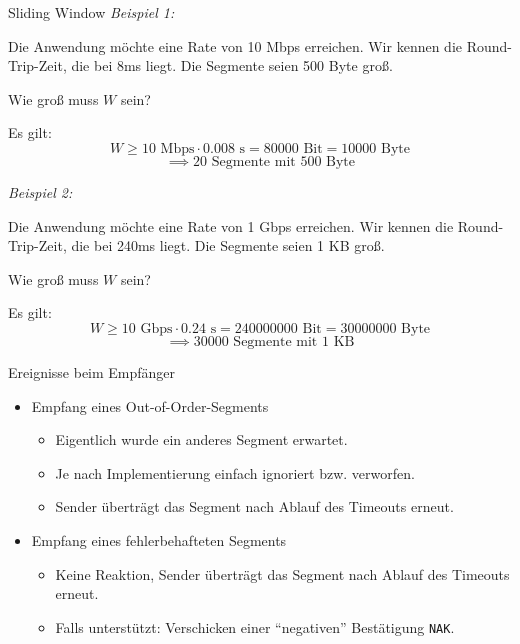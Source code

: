 \begin{example}{Sliding Window}
    \emph{Beispiel 1:}

    Die Anwendung möchte eine Rate von 10 Mbps erreichen.
    Wir kennen die Round-Trip-Zeit, die bei 8ms liegt.
    Die Segmente seien 500 Byte groß.

    Wie groß muss $W$ sein?

    Es gilt:
    \[
        W \geq 10 \text{ Mbps} \cdot 0.008 \text{ s} = \num{80000} \text{ Bit} = \num{10000} \text{ Byte}
    \]
    \[
        \implies 20 \text{ Segmente mit } 500 \text{ Byte}
    \]

    \emph{Beispiel 2:}

    Die Anwendung möchte eine Rate von 1 Gbps erreichen.
    Wir kennen die Round-Trip-Zeit, die bei 240ms liegt.
    Die Segmente seien 1 KB groß.

    Wie groß muss $W$ sein?

    Es gilt:
    \[
        W \geq 10 \text{ Gbps} \cdot 0.24 \text{ s} = \num{240000000} \text{ Bit} = \num{30000000} \text{ Byte}
    \]
    \[
        \implies \num{30000} \text{ Segmente mit } 1 \text{ KB}
    \]

\end{example}

\begin{defi}{Ereignisse beim Empfänger}
    \begin{itemize}
        \item Empfang eines Out-of-Order-Segments
              \begin{itemize}
                  \item Eigentlich wurde ein anderes Segment erwartet.
                  \item Je nach Implementierung einfach ignoriert bzw. verworfen.
                  \item Sender überträgt das Segment nach Ablauf des Timeouts erneut.
              \end{itemize}
        \item Empfang eines fehlerbehafteten Segments
              \begin{itemize}
                  \item Keine Reaktion, Sender überträgt das Segment nach Ablauf des Timeouts erneut.
                  \item Falls unterstützt: Verschicken einer \enquote{negativen} Bestätigung \texttt{NAK}.
              \end{itemize}
    \end{itemize}
\end{defi}

